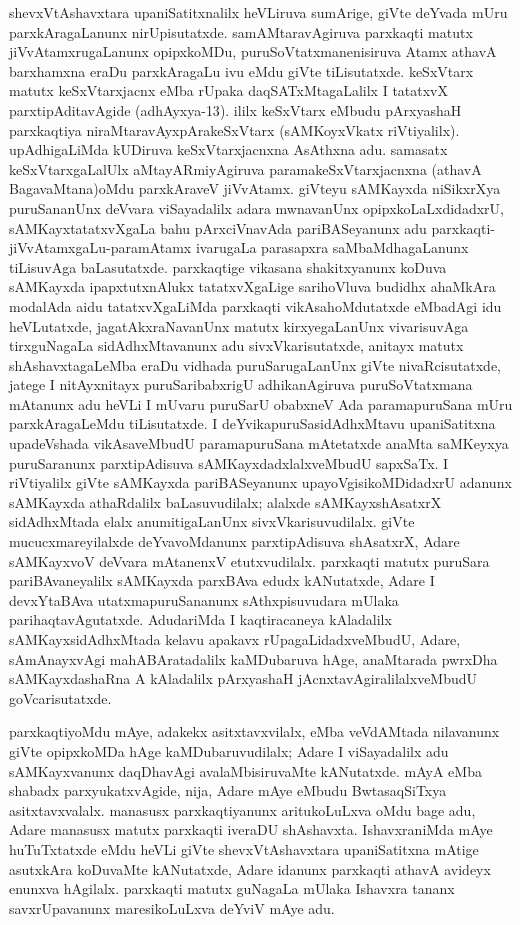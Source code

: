 shevxVtAshavxtara upaniSatitxnalilx heVLiruva sumArige, giVte deYvada mUru parxkAra\-gaLanunx nirUpisutatxde. samAMtaravAgiruva parxkaqti matutx jiVvAtamxrugaLanunx opipx\break\-koMDu, puruSoVtatxmanenisiruva Atamx athavA barxhamxna eraDu parxkAragaLu ivu eMdu giVte tiLisutatxde. keSxVtarx matutx keSxVtarxjacnx eMba rUpaka daqSATxMtagaLalilx I tatatxvX parxti\-pAdita\-vAgide (adhAyxya-{\rm 13}). ililx keSxVtarx eMbudu pArxyashaH parxkaqtiya niraMtaravAyxpAra\-keSxVtarx (sAMKoyxVkatx riVtiyalilx). upAdhigaLiMda kUDiruva keSxVtarxjacnxna AsAthxna adu. samasatx keSxVtarxgaLalUlx aMtayARmiyAgiruva paramakeSxVtarxjacnxna (athavA BagavaMtana)\break oMdu parxkAraveV jiVvAtamx. giVteyu sAMKayxda niSikxrXya puruSananUnx deVvara viSaya\-dalilx adara mwnavanUnx opipxkoLaLxdidadxrU, sAMKayxtatatxvXgaLa bahu pArxciVnavAda pari\-BASeyanunx adu parxkaqti-jiVvAtamxgaLu-paramAtamx ivarugaLa parasapxra saMbaMdhagaLanunx tiLisuvAga baLasutatxde. parxkaqtige vikasana shakitxyanunx koDuva sAMKayxda ipapxtutxnAlukx tatatxvXgaLige sarihoVluva budidhx ahaMkAra modalAda aidu tatatxvXgaLiMda parxkaqti vikAsahoMdutatxde eMbadAgi idu heVLutatxde, jagatAkxraNavanUnx matutx kirxyegaLanUnx vivarisuvAga tirxguNagaLa sidAdhxMtavanunx adu sivxVkarisutatxde, anitayx matutx shAshavxtagaLeMba eraDu vidhada puruSarugaLanUnx giVte nivaRcisutatxde, jatege I nitAyxnitayx puruSaribabxrigU adhikanAgiruva puruSoVtatxmana mAtanunx adu heVLi I mUvaru puruSarU obabxneV Ada paramapuruSana mUru parxkAragaLeMdu tiLisutatxde. I deYvikapuruSasidAdhxMtavu upaniSatitxna upadeVshada vikAsaveMbudU paramapuruSana mAtetatxde anaMta saMKeyxya puruSaranunx parxtipAdisuva sAMKayxdadxlalxveMbudU sapxSaTx. I riVtiyalilx giVte sAMKayxda pariBASeyanunx upayoVgisikoMDidadxrU adanunx sAMKayxda athaRdalilx baLasuvudilalx; alalxde sAMKayxshAsatxrX sidAdhxMtada elalx anumitigaLanUnx sivxVkarisuvudilalx. giVte mucucxmareyilalxde deYvavoMdanunx parxtipAdisuva shAsatxrX, Adare sAMKayxvoV deVvara mAtanenxV etutxvudilalx. parxkaqti matutx puruSara pariBAvaneyalilx sAMKayxda parxBAva edudx kANutatxde, Adare I devxYtaBAva utatxmapuruSananunx sAthxpisuvudara mUlaka parihaqtavAgutatxde. AdudariMda I kaqtiracaneya kAladalilx sAMKayxsidAdhxMtada kelavu apakavx rUpagaLidadxveMbudU, Adare, sAmAnayxvAgi mahABAratadalilx kaMDubaruva hAge, anaMtarada pwrxDha sAMKayxdashaRna A kAladalilx pArxyashaH jAcnxtavAgiralilalxveMbudU goVcarisutatxde.

parxkaqtiyoMdu mAye, adakekx asitxtavxvilalx, eMba veVdAMtada nilavanunx giVte opipxkoMDa hAge kaMDubaruvudilalx; Adare I viSayadalilx adu sAMKayxvanunx daqDhavAgi avalaMbisiruvaMte kANutatxde. mAyA eMba shabadx parxyukatxvAgide, nija, Adare mAye eMbudu BwtasaqSiTxya asitxtavxvalalx. manasusx parxkaqtiyanunx aritukoLuLxva oMdu bage adu, Adare manasusx matutx parxkaqti iveraDU shAshavxta. IshavxraniMda mAye huTuTxtatxde eMdu heVLi giVte shevxVtAshavxtara upaniSatitxna mAtige asutxkAra koDuvaMte kANutatxde, Adare idanunx parxkaqti athavA avideyx enunxva hAgilalx. parxkaqti matutx guNagaLa mUlaka Ishavxra tananx savxrUpavanunx maresikoLuLxva deYviV mAye adu.

